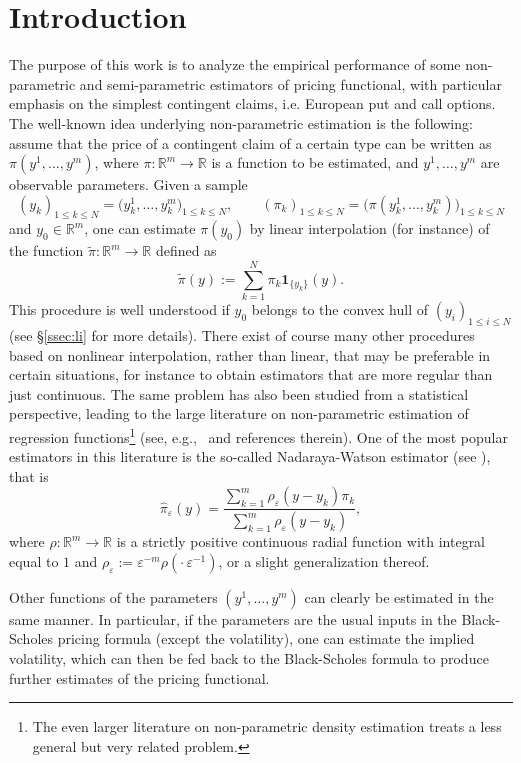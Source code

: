 \documentclass[11pt]{article}
\theoremstyle{remark}
\newcommand{\erre}{\mathbb{R}}
\newcommand{\ds}{\displaystyle}
\begin{document}
\section{Introduction}
\label{sec:intro}
The purpose of this work is to analyze the empirical performance of
some non-parametric and semi-parametric estimators of pricing
functional, with particular emphasis on the simplest contingent
claims, i.e. European put and call options. The well-known idea
underlying non-parametric estimation is the following: assume that the
price of a contingent claim of a certain type can be written as
$\pi(y^1,\ldots,y^m)$, where $\pi:\erre^m \to \erre$ is a function to
be estimated, and $y^1,\ldots,y^m$ are observable parameters. Given a
sample
\[
(y_k)_{1\leq k \leq N} = \bigl(y^1_k,\ldots,y^m_k\bigr)_{1\leq k \leq N},
\qquad (\pi_k)_{1\leq k \leq N} = 
\bigl( \pi(y^1_k,\ldots,y^m_k) \bigr)_{1\leq k \leq N}
\]
and $y_0 \in \erre^m$, one can estimate $\pi(y_0)$ by linear
interpolation (for instance) of the function
$\tilde{\pi}:\erre^m \to \erre$ defined as
\[
\tilde{\pi}(y) := \sum_{k=1}^N \pi_k \mathbf{1}_{\{y_k\}}(y).
\]
This procedure is well understood if $y_0$ belongs to the convex hull
of $(y_i)_{1\leq i \leq N}$ (see \S\ref{ssec:li} for more details). 
There exist of course many other procedures
based on nonlinear interpolation, rather than linear, that may be
preferable in certain situations, for instance to obtain estimators
that are more regular than just continuous. The same problem has also
been studied from a statistical perspective, leading to the large
literature on non-parametric estimation of regression
functions\footnote{The even larger literature on non-parametric density
  estimation treats a less general but very related problem.} (see,
e.g.,~\cite{Bierens} and references therein). One of the most popular
estimators in this literature is the so-called Nadaraya-Watson
estimator (see \cite{Nadaraya, Watson}), that is
\[
\hat{\pi}_\varepsilon(y) = 
\frac{\ds \sum_{k=1}^m \rho_\varepsilon(y-y_k) \pi_k}%
     {\ds \sum_{k=1}^m \rho_\varepsilon(y-y_k)},
\]
where $\rho:\erre^m \to \erre$ is a strictly positive continuous
radial function with integral equal to $1$ and
$\rho_\varepsilon := \varepsilon^{-m}\rho(\cdot \, \varepsilon^{-1})$,
or a slight generalization thereof.

Other functions of the parameters $(y^1,\ldots,y^m)$ can clearly be
estimated in the same manner. In particular, if the parameters are the
usual inputs in the Black-Scholes pricing formula (except the
volatility), one can estimate the implied volatility, which can then be
fed back to the Black-Scholes formula to produce further estimates of
the pricing functional.
\end{document}
